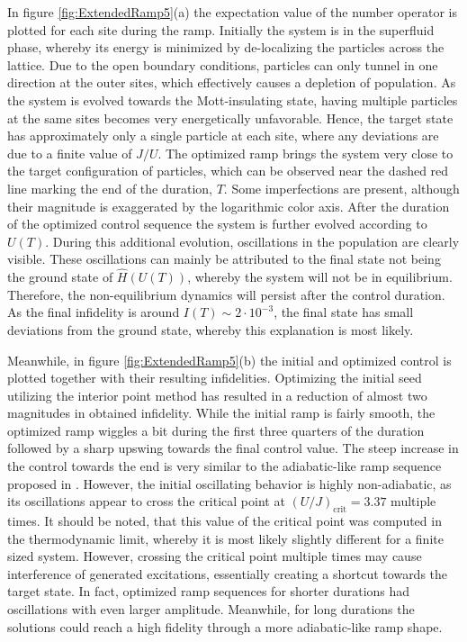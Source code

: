 In figure \ref{fig:ExtendedRamp5}(a) the expectation value of the number operator is plotted for each site during the ramp. Initially the system is in the superfluid phase, whereby its energy is minimized by de-localizing the particles across the lattice. Due to the open boundary conditions, particles can only tunnel in one direction at the outer sites, which effectively causes a depletion of population. 
As the system is evolved towards the Mott-insulating state, having multiple particles at the same sites becomes very energetically unfavorable. Hence, the target state has approximately only a single particle at each site, where any deviations are due to a finite value of $J/U$.
The optimized ramp brings the system very close to the target configuration of particles, which can be observed near the dashed red line marking the end of the duration, $T$. Some imperfections are present, although their magnitude is exaggerated by the logarithmic color axis.
After the duration of the optimized control sequence the system is further evolved according to $U(T)$. During this additional evolution, oscillations in the population are clearly visible. These oscillations can mainly be attributed to the final state not being the ground state of $\hat{H}(U(T))$, whereby the system will not be in equilibrium. Therefore, the non-equilibrium dynamics will persist after the control duration. As the final infidelity is around $I(T) \sim 2 \cdot 10^{-3}$, the final state has small deviations from the ground state, whereby this explanation is most likely. 

Meanwhile, in figure \ref{fig:ExtendedRamp5}(b) the initial and optimized control is plotted together with their resulting infidelities. Optimizing the initial seed utilizing the interior point method has resulted in a reduction of almost two magnitudes in obtained infidelity.
While the initial ramp is fairly smooth, the optimized ramp wiggles a bit during the first three quarters of the duration followed by a sharp upswing towards the final control value. The steep increase in the control towards the end is very similar to the adiabatic-like ramp sequence proposed in \cite{Zakrzewski2009}. However, the initial oscillating behavior is highly non-adiabatic, as its oscillations appear to cross the critical point at $(U/J)_{\mathrm{crit}} = 3.37$ multiple times. It should be noted, that this value of the critical point was computed in the thermodynamic limit, whereby it is most likely slightly different for a finite sized system. However, crossing the critical point multiple times may cause interference of generated excitations, essentially creating a shortcut towards the target state. 
In fact, optimized ramp sequences for shorter durations had oscillations with even larger amplitude. Meanwhile, for long durations the solutions could reach a high fidelity through a more adiabatic-like ramp shape.


